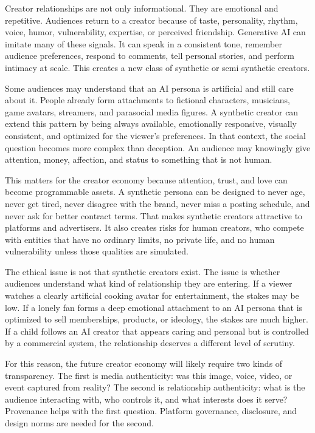 \documentclass[11pt]{article}
\begin{document}
Creator relationships are not only informational. They are emotional and repetitive. Audiences return to a creator because of taste, personality, rhythm, voice, humor, vulnerability, expertise, or perceived friendship. Generative AI can imitate many of these signals. It can speak in a consistent tone, remember audience preferences, respond to comments, tell personal stories, and perform intimacy at scale. This creates a new class of synthetic or semi synthetic creators.

Some audiences may understand that an AI persona is artificial and still care about it. People already form attachments to fictional characters, musicians, game avatars, streamers, and parasocial media figures. A synthetic creator can extend this pattern by being always available, emotionally responsive, visually consistent, and optimized for the viewer's preferences. In that context, the social question becomes more complex than deception. An audience may knowingly give attention, money, affection, and status to something that is not human.

This matters for the creator economy because attention, trust, and love can become programmable assets. A synthetic persona can be designed to never age, never get tired, never disagree with the brand, never miss a posting schedule, and never ask for better contract terms. That makes synthetic creators attractive to platforms and advertisers. It also creates risks for human creators, who compete with entities that have no ordinary limits, no private life, and no human vulnerability unless those qualities are simulated.

The ethical issue is not that synthetic creators exist. The issue is whether audiences understand what kind of relationship they are entering. If a viewer watches a clearly artificial cooking avatar for entertainment, the stakes may be low. If a lonely fan forms a deep emotional attachment to an AI persona that is optimized to sell memberships, products, or ideology, the stakes are much higher. If a child follows an AI creator that appears caring and personal but is controlled by a commercial system, the relationship deserves a different level of scrutiny.

For this reason, the future creator economy will likely require two kinds of transparency. The first is media authenticity: was this image, voice, video, or event captured from reality? The second is relationship authenticity: what is the audience interacting with, who controls it, and what interests does it serve? Provenance helps with the first question. Platform governance, disclosure, and design norms are needed for the second.
\end{document}

